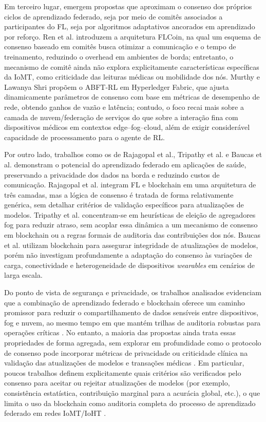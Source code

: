 \documentclass[12pt]{article}
\begin{document}
Em terceiro lugar, emergem propostas que aproximam o consenso dos próprios ciclos de aprendizado federado, seja por meio de comitês associados a participantes do FL, seja por algoritmos adaptativos ancorados em aprendizado por reforço. \cite{murthy2026,ren2024} Ren et al. introduzem a arquitetura FLCoin, na qual um esquema de consenso baseado em comitês busca otimizar a comunicação e o tempo de treinamento, reduzindo o overhead em ambientes de borda; entretanto, o mecanismo de comitê ainda não explora explicitamente características específicas da IoMT, como criticidade das leituras médicas ou mobilidade dos nós. \cite{ren2024} Murthy e Lawanya Shri propõem o ABFT-RL em Hyperledger Fabric, que ajusta dinamicamente parâmetros de consenso com base em métricas de desempenho de rede, obtendo ganhos de vazão e latência; contudo, o foco recai mais sobre a camada de nuvem/federação de serviços do que sobre a interação fina com dispositivos médicos em contextos edge–fog–cloud, além de exigir considerável capacidade de processamento para o agente de RL. \cite{murthy2026}

Por outro lado, trabalhos como os de Rajagopal et al., Tripathy et al. e Baucas et al. demonstram o potencial do aprendizado federado em aplicações de saúde, preservando a privacidade dos dados na borda e reduzindo custos de comunicação. \cite{rajagopal2025,tripathy2024,baucas2023} Rajagopal et al. integram FL e blockchain em uma arquitetura de três camadas, mas a lógica de consenso é tratada de forma relativamente genérica, sem detalhar critérios de validação específicos para atualizações de modelos. \cite{rajagopal2025} Tripathy et al. concentram-se em heurísticas de eleição de agregadores fog para reduzir atraso, sem acoplar essa dinâmica a um mecanismo de consenso em blockchain ou a regras formais de auditoria das contribuições dos nós. \cite{tripathy2024} Baucas et al. utilizam blockchain para assegurar integridade de atualizações de modelos, porém não investigam profundamente a adaptação do consenso às variações de carga, conectividade e heterogeneidade de dispositivos \textit{wearables} em cenários de larga escala. \cite{baucas2023}

Do ponto de vista de segurança e privacidade, os trabalhos analisados evidenciam que a combinação de aprendizado federado e blockchain oferece um caminho promissor para reduzir o compartilhamento de dados sensíveis entre dispositivos, fog e nuvem, ao mesmo tempo em que mantém trilhas de auditoria robustas para operações críticas \cite{rajagopal2025,baucas2023,ahmad2023}. No entanto, a maioria das propostas ainda trata essas propriedades de forma agregada, sem explorar em profundidade como o protocolo de consenso pode incorporar métricas de privacidade ou criticidade clínica na validação das atualizações de modelos e transações médicas \cite{cheikhrouhou2023,laouamri2025,murthy2026}. Em particular, poucos trabalhos definem explicitamente quais critérios são verificados pelo consenso para aceitar ou rejeitar atualizações de modelos (por exemplo, consistência estatística, contribuição marginal para a acurácia global, etc.), o que limita o uso da blockchain como auditoria completa do processo de aprendizado federado em redes IoMT/IoHT \cite{rajagopal2025,ren2024,baucas2023,murthy2026,aljoboury2020}.
\end{document}
